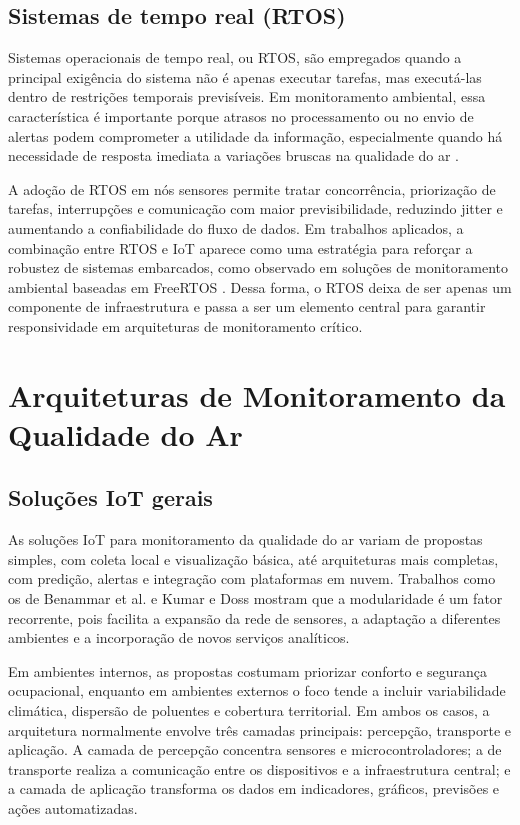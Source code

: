 \documentclass[12pt,a4paper]{article}
\begin{document}
\subsection{Sistemas de tempo real (RTOS)}
Sistemas operacionais de tempo real, ou RTOS, são empregados quando a principal exigência do sistema não é apenas executar tarefas, 
mas executá-las dentro de restrições temporais previsíveis. Em monitoramento ambiental, essa característica é importante porque atrasos 
no processamento ou no envio de alertas podem comprometer a utilidade da informação, especialmente quando há necessidade de resposta imediata a 
variações bruscas na qualidade do ar \cite{reddy2023}.

A adoção de RTOS em nós sensores permite tratar concorrência, priorização de tarefas, interrupções e comunicação com maior previsibilidade, 
reduzindo jitter e aumentando a confiabilidade do fluxo de dados. Em trabalhos aplicados, a combinação entre RTOS e IoT aparece como uma 
estratégia para reforçar a robustez de sistemas embarcados, como observado em soluções de monitoramento ambiental baseadas em 
FreeRTOS \cite{septian2022,silva2025smartcampusrtos}. Dessa forma, o RTOS deixa de ser apenas um componente de infraestrutura e passa a ser um elemento central 
para garantir responsividade em arquiteturas de monitoramento crítico.

\section{Arquiteturas de Monitoramento da Qualidade do Ar}
\subsection{Soluções IoT gerais}
As soluções IoT para monitoramento da qualidade do ar variam de propostas simples, com coleta local e 
visualização básica, até arquiteturas mais completas, com predição, alertas e integração com plataformas em nuvem. 
Trabalhos como os de Benammar et al. \cite{benammar2018} e Kumar e Doss \cite{kumar2023} mostram que a modularidade é um fator 
recorrente, pois facilita a expansão da rede de sensores, a adaptação a diferentes ambientes e a incorporação de novos serviços analíticos.

Em ambientes internos, as propostas costumam priorizar conforto e segurança ocupacional, enquanto em ambientes externos o foco tende a 
incluir variabilidade climática, dispersão de poluentes e cobertura territorial. Em ambos os casos, a arquitetura normalmente envolve três 
camadas principais: percepção, transporte e aplicação. A camada de percepção concentra sensores e microcontroladores; a de transporte realiza a 
comunicação entre os dispositivos e a infraestrutura central; e a camada de aplicação transforma os dados em indicadores, gráficos, previsões e ações automatizadas.
\end{document}
